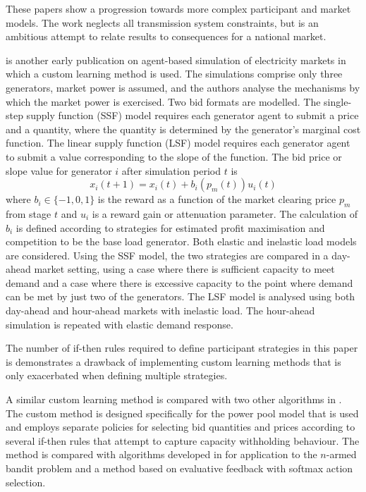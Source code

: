These papers show a progression towards more complex participant and market
models.  The work neglects all transmission system constraints, but is an
ambitious attempt to relate results to consequences for a national market.

 is another early publication on agent-based simulation of
electricity markets in which a custom learning method is used.  The simulations
comprise only three generators, market power is assumed, and the authors analyse
the mechanisms by which the market power is exercised.  Two bid formats are
modelled.  The single-step supply function (SSF) model requires each generator
agent to submit a price and a quantity, where the quantity is determined by the
generator's marginal cost function.  The linear supply function (LSF) model
requires each generator agent to submit a value corresponding to the slope of
the function.  The bid price or slope value for generator $i$ after simulation
period $t$ is
\begin{equation}
x_i(t+1) = x_i(t) + b_i (p_m(t)) u_i(t)
\end{equation}
where $b_i \in \lbrace-1,0,1\rbrace$ is the reward as a function of the market
clearing price $p_m$ from stage $t$ and $u_i$ is a reward gain or attenuation
parameter.  The calculation of $b_i$ is defined according to strategies for
estimated profit maximisation and competition to be the base load generator.
Both elastic and inelastic load models are considered.  Using the SSF
model, the two strategies are compared in a day-ahead market setting,
using a case where there is sufficient capacity to meet demand and a case where
there is excessive capacity to the point where demand can be met by just two of
the generators.  The LSF model is analysed using both day-ahead and
hour-ahead markets with inelastic load.  The hour-ahead simulation is repeated
with elastic demand response.

The number of if-then rules required to define participant strategies in this
paper is demonstrates a drawback of implementing custom learning methods that
is only exacerbated when defining multiple strategies.

A similar custom learning method is compared with two other algorithms in
.  The custom method is designed specifically for the
power pool model that is used and employs separate policies for selecting bid
quantities and prices according to several if-then rules that attempt to
capture capacity withholding behaviour.  The method is compared with
algorithms developed in  for application to the $n$-armed
bandit problem \cite[\S2.1]{robbins:53,suttonbarto:1998} and a method based on
evaluative feedback with softmax action selection.

